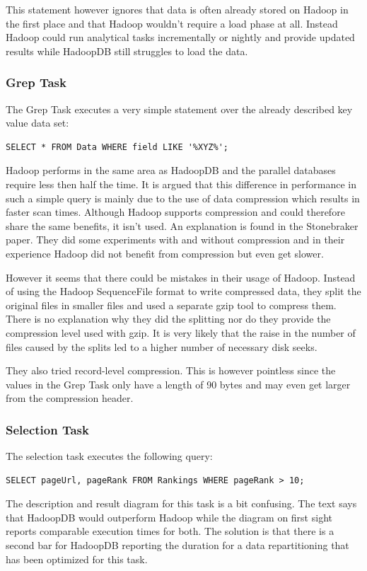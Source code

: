 \documentclass[12pt,a4paper]{scrartcl}		%
\begin{document}
This statement however ignores that data is often already stored on Hadoop in the first place and that Hadoop wouldn't require a load phase at all. Instead Hadoop could run analytical tasks incrementally or nightly and provide updated results while HadoopDB still struggles to load the data.

\subsubsection{Grep Task}
The Grep Task executes a very simple statement over the already described key value data set:
\begin{verbatim}
SELECT * FROM Data WHERE field LIKE '%XYZ%';
\end{verbatim}
Hadoop performs in the same area as HadoopDB and the parallel databases require less then half the time. It is argued that this difference in performance in such a simple query is mainly due to the use of data compression which results in faster scan times. Although Hadoop supports compression and could therefore share the same benefits, it isn't used. An explanation is found in the Stonebraker paper. They did some experiments with and without compression and in their experience Hadoop did not benefit from compression but even get slower.

However it seems that there could be mistakes in their usage of Hadoop. Instead of using the Hadoop SequenceFile format to write compressed data, they split the original files in smaller files and used a separate gzip tool to compress them. There is no explanation why they did the splitting nor do they provide the compression level used with gzip. It is very likely that the raise in the number of files caused by the splits led to a higher number of necessary disk seeks.

They also tried record-level compression. This is however pointless since the values in the Grep Task only have a length of 90 bytes and may even get larger from the compression header.

\subsubsection{Selection Task}
The selection task executes the following query:
\begin{verbatim}
SELECT pageUrl, pageRank FROM Rankings WHERE pageRank > 10;
\end{verbatim}

The description and result diagram for this task is a bit confusing. The text says that HadoopDB would outperform Hadoop while the diagram on first sight reports comparable execution times for both. The solution is that there is a second bar for HadoopDB reporting the duration for a data repartitioning that has been optimized for this task.
\end{document}
